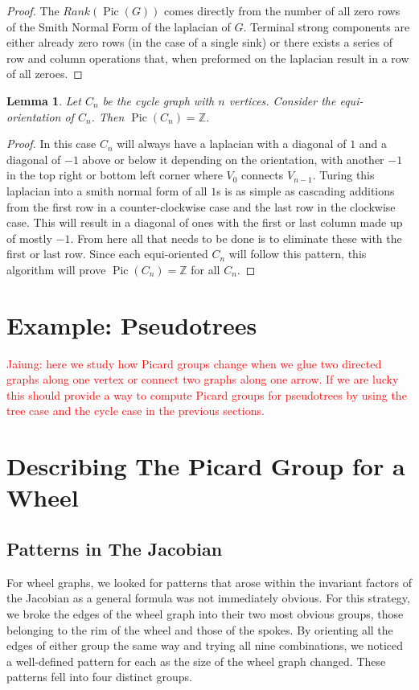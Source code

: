 \documentclass[11pt,reqno]{amsart}
\DeclareMathOperator{\Pic}{Pic}
\theoremstyle{definition}
\theoremstyle{plain}
\newtheorem{lem}[mydef]{\textbf{Lemma}}
\begin{document}
		\begin{proof}
			The $Rank(\Pic(G))$ comes directly from the number of all zero rows of the Smith Normal Form of the laplacian of
			$G$.  Terminal strong components are either already zero rows (in the case of a single sink) or there
			exists a series of row and column operations that, when preformed on the laplacian result in a row of all
			zeroes.
		\end{proof}

	\begin{lem}
		Let $C_n$ be the cycle graph with $n$ vertices. Consider the equi-orientation of $C_n$.
		Then $\Pic(C_n)=\mathbb{Z}$.
	\end{lem}
	\begin{proof}
		In this case $C_n$ will always have a laplacian with a diagonal of $1$ and a diagonal of $-1$
		above or below it depending on the orientation, with another $-1$ in the top right or bottom left corner
		where $V_0$ connects $V_{n-1}$.  Turing this laplacian into a smith normal form of all $1$s is as simple as
		cascading additions from the first row in a counter-clockwise case and the last row in the clockwise case.
		This will result in a diagonal of ones with the first or last column made up of mostly $-1$.  From here
		all that needs to be done is to eliminate these with the first or last row.  Since each equi-oriented $C_n$
		will follow this pattern, this algorithm will prove $\Pic(C_n)=\mathbb{Z}$ for all $C_n$.
	\end{proof}

\section{Example: Pseudotrees}

	\textcolor{red}{Jaiung: here we study how Picard groups change when we glue two directed graphs along one vertex or
		connect two graphs along one arrow. If we are lucky this should provide a way to compute Picard groups for
		pseudotrees by using the tree case and the cycle case in the previous sections.}

\section{Describing The Picard Group for a Wheel}

	\subsection{Patterns in The Jacobian}
		For wheel graphs, we looked for patterns that arose within the invariant factors of the Jacobian as
		a general formula was not immediately obvious.  For this strategy, we broke the edges of the wheel graph into
		their two most obvious groups, those belonging to the rim of the wheel and those of the spokes.  By orienting
		all the edges of either group the same way and trying all nine combinations, we noticed a well-defined pattern
		for each as the size of the wheel graph changed.  These patterns fell into four distinct groups.
\end{document}
